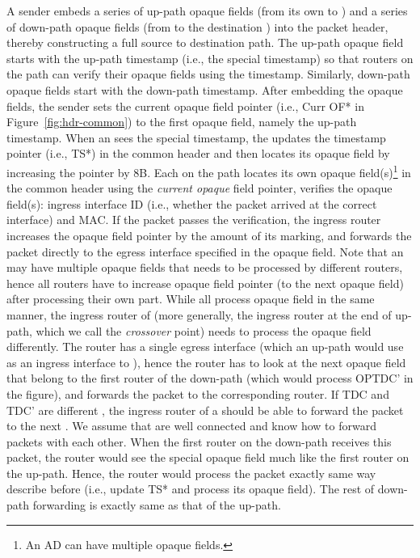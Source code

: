 \noindent A sender embeds a series of up-path opaque fields (from its own \AD to \TDC \AD) and a series of down-path opaque fields (from \TDC \AD to the destination \AD) into the packet header, thereby constructing a full source to destination path. The up-path opaque field starts with the up-path timestamp (i.e., the special timestamp) so that routers on the path can verify their opaque fields using the timestamp. Similarly, down-path opaque fields start with the down-path timestamp. After embedding the opaque fields, the sender sets the current opaque field pointer (i.e., Curr OF* in Figure~\ref{fig:hdr-common}) to the first opaque field, namely the up-path timestamp. When an \AD sees the special timestamp, the \AD updates the timestamp pointer (i.e., TS*) in the common header and then locates its opaque field by increasing the pointer by 8B. Each \AD on the path locates its own opaque field(s)\footnote{An AD can have multiple opaque fields.} in the common header using the {\em current opaque} field pointer, verifies the opaque field(s): ingress interface ID (i.e., whether the packet arrived at the correct interface) and MAC. If the packet passes the verification, the ingress router increases the opaque field pointer by the amount of its marking, and forwards the packet directly to the egress interface specified in the opaque field. Note that an \AD may have multiple opaque fields that needs to be processed by different routers, hence all routers have to increase opaque field pointer (to the next opaque field) after processing their own part. While all \ADs process opaque field in the same manner, the ingress router of \TDC \AD (more generally, the ingress router at the end of up-path, which we call the {\em crossover} point) needs to process the opaque field differently. The router has a single egress interface (which an up-path would use as an ingress interface to \TDC \AD), hence the router has to look at the next opaque field that belong to the first router of the down-path (which would process OPTDC' in the figure), and forwards the packet to the corresponding router. If TDC and TDC' are different \TDC \ADs, the ingress router of a \TDC \AD should be able to forward the packet to the next \TDC \AD. We assume that \TDC \ADs are well connected and know how to forward packets with each other. When the first router on the down-path receives this packet, the router would see the special opaque field much like the first router on the up-path. Hence, the router would process the packet exactly same way describe before (i.e., update TS* and process its opaque field). The rest of down-path forwarding is exactly same as that of the up-path. 



